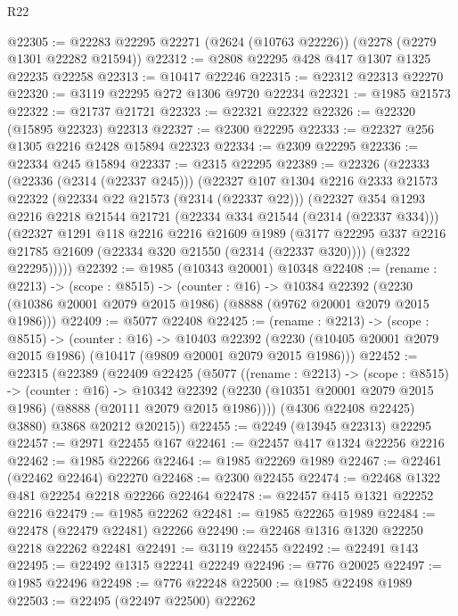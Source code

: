 \begin{lexlean}{R22}
\begin{coremodule}
@22305 := @22283 @22295 @22271 (@2624 (@10763 @22226)) (@2278 (@2279 @1301 @22282 @21594))
@22312 := @2808 @22295 @428 @417 @1307 @1325 @22235 @22258
@22313 := @10417 @22246
@22315 := @22312 @22313 @22270
@22320 := @3119 @22295 @272 @1306 @9720 @22234
@22321 := @1985 @21573
@22322 := @21737 @21721
@22323 := @22321 @22322
@22326 := @22320 (@15895 @22323) @22313
@22327 := @2300 @22295
@22333 := @22327 @256 @1305 @2216 @2428 @15894 @22323
@22334 := @2309 @22295
@22336 := @22334 @245 @15894
@22337 := @2315 @22295
@22389 := @22326
    (@22333
      (@22336 (@2314 (@22337 @245)))
      (@22327
        @107
        @1304
        @2216
        @2333
        @21573
        @22322
        (@22334 @22 @21573 (@2314 (@22337 @22)))
        (@22327
          @354
          @1293
          @2216
          @2218
          @21544
          @21721
          (@22334 @334 @21544 (@2314 (@22337 @334)))
          (@22327
            @1291
            @118
            @2216
            @2216
            @21609
            @1989
            (@3177 @22295 @337 @2216 @21785 @21609 (@22334 @320 @21550 (@2314 (@22337 @320))))
            (@2322 @22295)))))
@22392 := @1985 (@10343 @20001) @10348
@22408 := (rename : @2213) ->
  (scope : @8515) ->
  (counter : @16) ->
  @10384 @22392 (@2230 (@10386 @20001 @2079 @2015 @1986) (@8888 (@9762 @20001 @2079 @2015 @1986)))
@22409 := @5077 @22408
@22425 := (rename : @2213) ->
  (scope : @8515) ->
  (counter : @16) ->
  @10403 @22392 (@2230 (@10405 @20001 @2079 @2015 @1986) (@10417 (@9809 @20001 @2079 @2015 @1986)))
@22452 := @22315
    (@22389
      (@22409
        @22425
        (@5077
          ((rename : @2213) ->
          (scope : @8515) ->
          (counter : @16) ->
          @10342
            @22392
            (@2230 (@10351 @20001 @2079 @2015 @1986) (@8888 (@20111 @2079 @2015 @1986))))
          (@4306 @22408 @22425)
          @3880)
        @3868
        @20212
        @20215))
@22455 := @2249 (@13945 @22313) @22295
@22457 := @2971 @22455 @167
@22461 := @22457 @417 @1324 @22256 @2216
@22462 := @1985 @22266
@22464 := @1985 @22269 @1989
@22467 := @22461 (@22462 @22464) @22270
@22468 := @2300 @22455
@22474 := @22468 @1322 @481 @22254 @2218 @22266 @22464
@22478 := @22457 @415 @1321 @22252 @2216
@22479 := @1985 @22262
@22481 := @1985 @22265 @1989
@22484 := @22478 (@22479 @22481) @22266
@22490 := @22468 @1316 @1320 @22250 @2218 @22262 @22481
@22491 := @3119 @22455
@22492 := @22491 @143
@22495 := @22492 @1315 @22241 @22249
@22496 := @776 @20025
@22497 := @1985 @22496
@22498 := @776 @22248
@22500 := @1985 @22498 @1989
@22503 := @22495 (@22497 @22500) @22262

\end{coremodule}
\end{lexlean}
